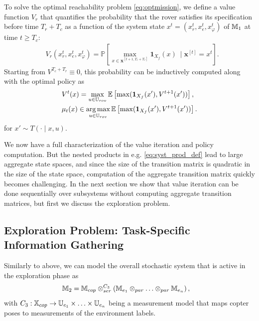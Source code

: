 \documentclass[conference]{IEEEtran}
\begin{document}
To solve the optimal reachability problem \eqref{eq:optmission}, we define a value function $V_r$ that quantifies the probability that the rover satisfies its specification before time $T_r + T_c$ as a function of the system state $x^{t}=(x^{t}_r, x^{t}_e, x^{t}_\varphi)$ of $\mathbb{M}_1$ at time $t\geq T_c$:
\begin{equation}
\label{eq:rovervalue}
\begin{aligned}
	& V_r(x^{t}_r, x^{t}_e, x^{t}_\varphi)  = \mathbb{P} \left[\max_{x\in \mathbf{x}^{[t+1,T_c+T_r]}} \mathbf 1_{X_f}(x) \ \mid \mathbf{x}^{[t]} = x^{t} \right].
\end{aligned}
\end{equation}
Starting from $ V^{T_c+T_r}\equiv 0$, this probability can be inductively computed along with the optimal policy as
\begin{subequations}
\label{eq:value_iter_mission}
  \begin{align} 
    & V^{t}(x)  = \max_{u \in \U_{rov}} \mathbb{E}\left[ \max( \ind_{X_f}(x'), V^{t+1}(x')) \right] \label{eq:iter_mission}, \\
    & \pol_t(x) \in \argmax_{u\in \U_{rov}} \mathbb E \left[ \max( \ind_{X_f}(x'), V^{t+1}(x')) \right] .  \end{align}
\end{subequations}
 for $x'\sim  T(\cdot \mid x, u)$.

We now have a full characterization of the value iteration and policy computation. But the nested products in e.g. \eqref{eq:syst_prod_def} lead to large aggregate state spaces, and since the size of the transition matrix is quadratic in the size of the state space, computation of the aggregate transition matrix quickly becomes challenging. In the next section we show that value iteration can be done sequentially over subsystems without computing aggregate transition matrices, but first we discuss the exploration problem.

\subsection{Exploration Problem: Task-Specific Information Gathering}
\label{sub:information}
 
Similarly to above, we can model the overall stochastic system that is active in the exploration phase as 
\begin{equation}
\begin{aligned} 
	\mathbb{M}_2 & = \mathbb{M}_{cop} \otimes_{ser}^{C_3} \left( \mathbb{M}_{e_1} \otimes_{par} \ldots \otimes_{par} \mathbb{M}_{e_n} \right),
\end{aligned}
\end{equation}
with $C_3 : \mathbb{X}_{cop} \rightarrow \mathbb{U}_{e_1} \times \ldots \times \mathbb{U}_{e_n}$ being a measurement model that maps copter poses to measurements of the environment labels. 
\end{document}
